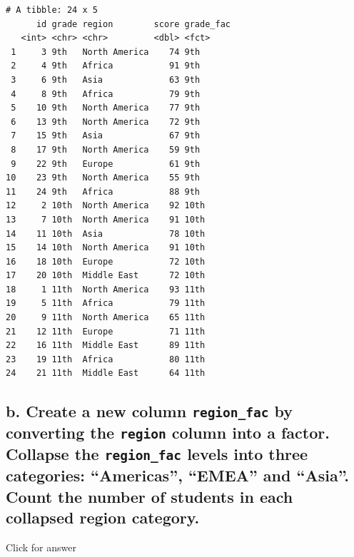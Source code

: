 \documentclass[
]{book}
\begin{document}
\begin{verbatim}
# A tibble: 24 x 5
      id grade region        score grade_fac
   <int> <chr> <chr>         <dbl> <fct>    
 1     3 9th   North America    74 9th      
 2     4 9th   Africa           91 9th      
 3     6 9th   Asia             63 9th      
 4     8 9th   Africa           79 9th      
 5    10 9th   North America    77 9th      
 6    13 9th   North America    72 9th      
 7    15 9th   Asia             67 9th      
 8    17 9th   North America    59 9th      
 9    22 9th   Europe           61 9th      
10    23 9th   North America    55 9th      
11    24 9th   Africa           88 9th      
12     2 10th  North America    92 10th     
13     7 10th  North America    91 10th     
14    11 10th  Asia             78 10th     
15    14 10th  North America    91 10th     
16    18 10th  Europe           72 10th     
17    20 10th  Middle East      72 10th     
18     1 11th  North America    93 11th     
19     5 11th  Africa           79 11th     
20     9 11th  North America    65 11th     
21    12 11th  Europe           71 11th     
22    16 11th  Middle East      89 11th     
23    19 11th  Africa           80 11th     
24    21 11th  Middle East      64 11th     
\end{verbatim}

\hypertarget{b.-create-a-new-column-region_fac-by-converting-the-region-column-into-a-factor.-collapse-the-region_fac-levels-into-three-categories-americas-emea-and-asia.-count-the-number-of-students-in-each-collapsed-region-category.}{%
\subsection{\texorpdfstring{b. Create a new column \texttt{region\_fac} by converting the \texttt{region} column into a factor. Collapse the \texttt{region\_fac} levels into three categories: ``Americas'', ``EMEA'' and ``Asia''. Count the number of students in each collapsed region category.}{b. Create a new column region\_fac by converting the region column into a factor. Collapse the region\_fac levels into three categories: ``Americas'', ``EMEA'' and ``Asia''. Count the number of students in each collapsed region category.}}\label{b.-create-a-new-column-region_fac-by-converting-the-region-column-into-a-factor.-collapse-the-region_fac-levels-into-three-categories-americas-emea-and-asia.-count-the-number-of-students-in-each-collapsed-region-category.}}

Click for answer
\end{document}
